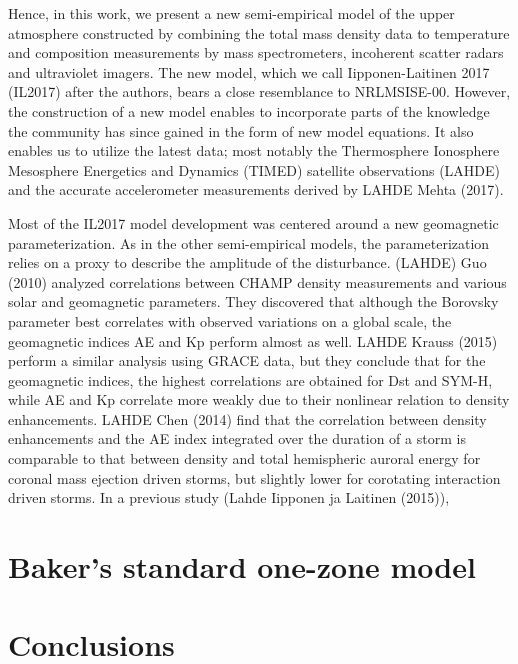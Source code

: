\documentclass[referee,a4paper,12pt,traditabstract]{swsc}
\begin{document}
\begin{linenumbers}
Hence, in this work, we present a new semi-empirical model of the upper atmosphere constructed by combining the total mass density data to temperature and composition measurements by mass spectrometers, incoherent scatter radars and ultraviolet imagers. The new model, which we call Iipponen-Laitinen 2017 (IL2017) after the authors, bears a close resemblance to NRLMSISE-00. However, the construction of a new model enables to incorporate parts of the knowledge the community has since gained in the form of new model equations. It also enables us to utilize the latest data; most notably the Thermosphere Ionosphere Mesosphere Energetics and Dynamics (TIMED) satellite observations (LAHDE) and the accurate accelerometer measurements derived by LAHDE Mehta (2017). 

Most of the IL2017 model development was centered around a new geomagnetic parameterization. As in the other semi-empirical models, the parameterization relies on a proxy to describe the amplitude of the disturbance. (LAHDE) Guo (2010) analyzed correlations between CHAMP density measurements and various solar and geomagnetic parameters. They discovered that although the Borovsky parameter best correlates with observed variations on a global scale, the geomagnetic indices AE and Kp perform almost as well. LAHDE Krauss (2015) perform a similar analysis using GRACE data, but they conclude that for the geomagnetic indices, the highest correlations are obtained for Dst and SYM-H, while AE and Kp correlate more weakly due to their nonlinear relation to density enhancements. LAHDE Chen (2014) find that the correlation between density enhancements and the AE index integrated over the duration of a storm is comparable to that between density and total hemispheric auroral energy for coronal mass ejection driven storms, but slightly lower for corotating interaction driven storms. In a previous study (Lahde Iipponen ja Laitinen (2015)), 

\section{Baker's standard one-zone model}



\section{Conclusions}



\begin{acknowledgements}

\end{acknowledgements}




\end{linenumbers}
\end{document}
